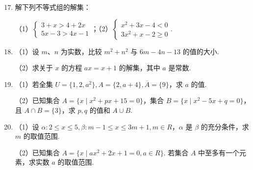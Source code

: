 \documentclass[a4paper,11pt]{article}
\begin{document}
\begin{enumerate}
\setcounter{enumi}{16}

\item 解下列不等式组的解集：

（1）$\begin{cases}3+x>4+2x\\ 5x-3>4x-1\end{cases}$；（2）$\begin{cases}x^2+3x-4<0\\ 3x^2+x-2\geqslant0\end{cases}$.

\ifanswer
\ans{（1）$\varnothing$；（2）$(-4,-1]\cup\left[\dfrac23,1\right)$}
\fi

\ansspace[6]

\item （1）设 $m$、$n$ 为实数，比较 $m^2+n^2$ 与 $6m-4n-13$ 的值的大小.

（2）求关于 $x$ 的方程 $ax=x+1$ 的解集，其中 $a$ 是常数.

\ifanswer
\solbegin
{}
\solend
\fi

\ansspace[6]

\item （1）若全集 $U=\{1,2,a^2\},A=\{2,a+4\},\overline A=\{9\}$，求 $a$ 的值.

（2）已知集合 $A=\{x\mid x^2+px+15=0\}$，集合 $B=\{x\mid x^2-5x+q=0\}$，且 $A\cap B=\{3\}$，求 $p,q$ 的值和 $A\cup B$.

\ifanswer
\fi

\ansspace[6]

\item （1）设 $\alpha:2\leqslant x\leqslant5,\beta:m-1\leqslant x\leqslant3m+1,m\in R$，$\alpha$ 是 $\beta$ 的充分条件，求 $m$ 的取值范围.

（2）已知集合 $A=\{x\mid ax^2+2x+1=0,a\in R\}$. 若集合 $A$ 中至多有一个元素，求实数 $a$ 的取值范围.

\ifanswer
\ans{（1）$\left[\dfrac43,3\right]$；（2）$\{0\}\cup[1,+\infty)$}
\fi


\end{enumerate}
\end{document}
